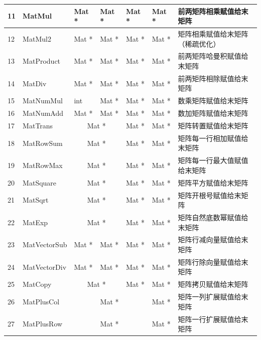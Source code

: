 \documentclass[UTF-8]{progbookcn}
\begin{document}
\begin{table}[!h]
{\begin{tabular}{|l|l|l|l|l|l|l|}
11 & MatMul       & \multicolumn{1}{l|}{Mat *} & Mat *         & Mat *        & Mat * & 前两矩阵相乘赋值给末矩阵    \\ \hline
12 & MatMul2      & \multicolumn{1}{l|}{Mat *} & Mat *         & Mat *        & Mat * & 矩阵相乘赋值给末矩阵（稀疏优化）  \\ \hline
13 & MatProduct   & \multicolumn{1}{l|}{Mat *} & Mat *         & Mat *        & Mat * & 前两矩阵哈曼积赋值给末矩阵   \\ \hline
14 & MatDiv       & \multicolumn{1}{l|}{Mat *} & Mat *         & Mat *        & Mat * & 前两矩阵相除赋值给末矩阵    \\ \hline
15 & MatNumMul    & \multicolumn{1}{l|}{int}   & Mat *         & Mat *        & Mat * & 数乘矩阵赋值给末矩阵     \\ \hline
16 & MatNumAdd    & \multicolumn{1}{l|}{Mat *} & Mat *         & Mat *        & Mat * & 数加矩阵赋值给末矩阵     \\ \hline
17 & MatTrans     & \multicolumn{2}{c|}{Mat *}                 & Mat *        & Mat * & 矩阵转置赋值给末矩阵     \\ \hline
18 & MatRowSum    & \multicolumn{2}{c|}{Mat *}                 & Mat *        & Mat * & 矩阵每一行相加赋值给末矩阵  \\ \hline
19 & MatRowMax    & \multicolumn{2}{c|}{Mat *}                 & Mat *        & Mat * & 矩阵每一行最大值赋值给末矩阵 \\ \hline
20 & MatSquare    & \multicolumn{2}{c|}{Mat *}                 & Mat *        & Mat * & 矩阵平方赋值给末矩阵     \\ \hline
21 & MatSqrt      & \multicolumn{2}{c|}{Mat *}                 & Mat *        & Mat * & 矩阵开根号赋值给末矩阵    \\ \hline
22 & MatExp       & \multicolumn{2}{c|}{Mat *}                 & Mat *        & Mat * & 矩阵自然底数幂赋值给末矩阵  \\ \hline
23 & MatVectorSub & \multicolumn{1}{l|}{Mat *} & Mat *         & Mat *        & Mat * & 矩阵行减向量赋值给末矩阵   \\ \hline
24 & MatVectorDiv & \multicolumn{1}{l|}{Mat *} & Mat *         & Mat *        & Mat * & 矩阵行除向量赋值给末矩阵   \\ \hline
25 & MatCopy      & \multicolumn{2}{c|}{Mat *}                 & Mat *        & Mat * & 矩阵拷贝赋值给末矩阵     \\ \hline
26 & MatPlusCol   & \multicolumn{3}{c|}{Mat *}                 & Mat * & 矩阵一列扩展赋值给末矩阵   \\ \hline
27   & MatPlusRow   & \multicolumn{3}{c|}{Mat *}               & Mat * & 矩阵一行扩展赋值给末矩阵   \\ \hline
\end{tabular}}
\end{table}
\end{document}
